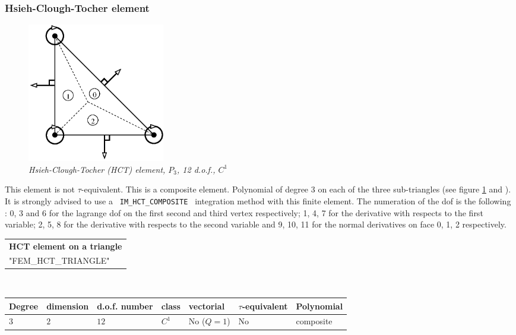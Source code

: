 \documentclass[10pt,a4paper]{article}
\begin{document}
\subsubsection{Hsieh-Clough-Tocher element}

\begin{figure}[H]
  \begin{center}
    \includegraphics[width=6cm,angle=0]{getfemlist_HCT.eps}
  \end{center}
  \caption{ \it Hsieh-Clough-Tocher (HCT) element, $P_3$, 12 d.o.f., $C^1$}
  \label{fig:HCT_tr}
\end{figure}

This element is not \mbox{$\tau$-equivalent}. This is a composite element. Polynomial of degree 3 on each of the three sub-triangles (see figure \ref{fig:HCT_tr} and \cite{ciarlet1978}). It is strongly advised to use a \texttt{ IM\_HCT\_COMPOSITE } integration method with this finite element. The numeration of the dof is the following : 0, 3 and 6 for the lagrange dof on the first second and third vertex respectively; 1, 4, 7 for the derivative with respects to the first variable; 2, 5, 8 for the derivative with respects to the second variable and 9, 10, 11 for the normal derivatives on face 0, 1, 2 respectively.\\

\begin{center}
\begin{tabular}{|m{16.11cm}|} \hline 
{ \bf HCT element on a triangle}\\
"FEM\_HCT\_TRIANGLE"
\end{tabular} \\ \vspace{-1pt} 
\begin{tabular}{|m{2cm}|m{2cm}|m{2.5cm}|m{1.2cm}|m{2cm}|m{2cm}|m{1.8cm}|} \hline 
Degree & dimension & d.o.f. number & class & vectorial & \mbox{$\tau$-equivalent} & Polynomial \\ \hline
$3$ & $2$ & $12$ & $C^1$ & No \mbox{($Q = 1$)} & No & composite\\ \hline
\end{tabular}
\end{center}
\end{document}

